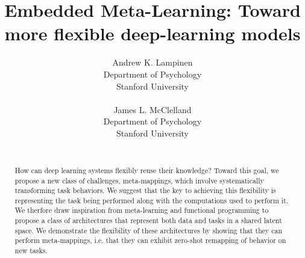 \documentclass{article}
\begin{document}
\title{Embedded Meta-Learning: Toward more flexible deep-learning models}
\author{%
Andrew K. Lampinen\\
Department of Psychology\\
Stanford University\\
\\
\And
James L. McClelland\\
Department of Psychology\\
Stanford University\\
\\
}
\date{}
\maketitle

\begin{abstract}
How can deep learning systems flexibly reuse their knowledge? Toward this goal, we propose a new class of challenges, meta-mappings, which involve systematically transforming task behaviors. We suggest that the key to achieving this flexibility is representing the task being performed along with the computations used to perform it. We therfore draw inspiration from meta-learning and functional programming to propose a class of architectures that represent both data and tasks in a shared latent space. We demonstrate the flexibility of these architectures by showing that they can perform meta-mappings, i.e. that they can exhibit zero-shot remapping of behavior on new tasks. 
\end{abstract}
\end{document}
